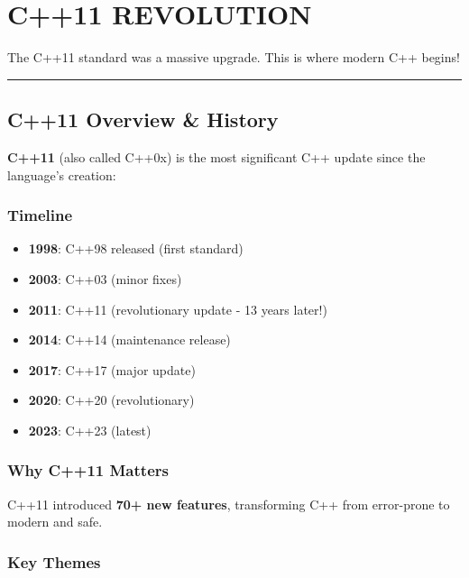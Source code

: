 \hypertarget{c11-revolution}{%
\chapter{C++11 REVOLUTION}\label{c11-revolution}}

The C++11 standard was a massive upgrade. This is where modern C++
begins!

\begin{center}\rule{0.5\linewidth}{0.5pt}\end{center}

\hypertarget{c11-overview-history}{%
\section{C++11 Overview \& History}\label{c11-overview-history}}

\textbf{C++11} (also called C++0x) is the most significant C++ update
since the language's creation:

\hypertarget{timeline}{%
\subsection{Timeline}\label{timeline}}

\begin{itemize}
\tightlist
\item
  \textbf{1998}: C++98 released (first standard)
\item
  \textbf{2003}: C++03 (minor fixes)
\item
  \textbf{2011}: C++11 (revolutionary update - 13 years later!)
\item
  \textbf{2014}: C++14 (maintenance release)
\item
  \textbf{2017}: C++17 (major update)
\item
  \textbf{2020}: C++20 (revolutionary)
\item
  \textbf{2023}: C++23 (latest)
\end{itemize}

\hypertarget{why-c11-matters}{%
\subsection{Why C++11 Matters}\label{why-c11-matters}}

C++11 introduced \textbf{70+ new features}, transforming C++ from
error-prone to modern and safe.

\hypertarget{key-themes}{%
\subsection{Key Themes}\label{key-themes}}


